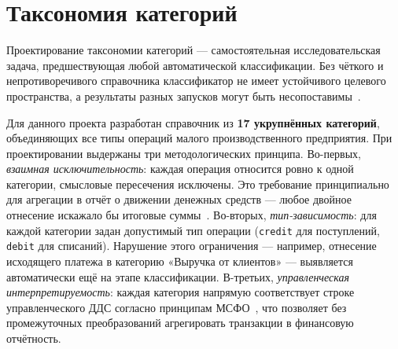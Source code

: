 \section{Таксономия категорий}

Проектирование таксономии категорий --- самостоятельная исследовательская задача, предшествующая любой автоматической классификации. Без чёткого и непротиворечивого справочника классификатор не имеет устойчивого целевого пространства, а результаты разных запусков могут быть несопоставимы~\cite{pustejovsky2012natural}.

Для данного проекта разработан справочник из \textbf{17 укрупнённых категорий}, объединяющих все типы операций малого производственного предприятия. При проектировании выдержаны три методологических принципа. Во-первых, \textit{взаимная исключительность}: каждая операция относится ровно к одной категории, смысловые пересечения исключены. Это требование принципиально для агрегации в отчёт о движении денежных средств --- любое двойное отнесение искажало бы итоговые суммы~\cite{ias7}. Во-вторых, \textit{тип-зависимость}: для каждой категории задан допустимый тип операции (\texttt{credit} для поступлений, \texttt{debit} для списаний). Нарушение этого ограничения --- например, отнесение исходящего платежа в категорию «Выручка от клиентов» --- выявляется автоматически ещё на этапе классификации. В-третьих, \textit{управленческая интерпретируемость}: каждая категория напрямую соответствует строке управленческого ДДС согласно принципам МСФО~\cite{ias7}, что позволяет без промежуточных преобразований агрегировать транзакции в финансовую отчётность.

